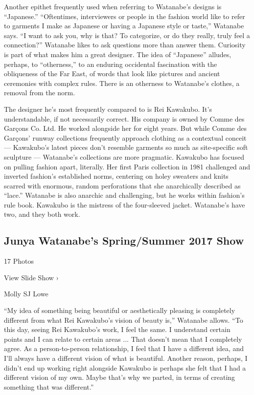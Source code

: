 Another epithet frequently used when referring to Watanabe's designs is
``Japanese.'' ``Oftentimes, interviewers or people in the fashion world
like to refer to garments I make as Japanese or having a Japanese style
or taste,'' Watanabe says. ``I want to ask you, why is that? To
categorize, or do they really, truly feel a connection?'' Watanabe likes
to ask questions more than answer them. Curiosity is part of what makes
him a great designer. The idea of ``Japanese'' alludes, perhaps, to
``otherness,'' to an enduring occidental fascination with the
obliqueness of the Far East, of words that look like pictures and
ancient ceremonies with complex rules. There is an otherness to
Watanabe's clothes, a removal from the norm.

The designer he's most frequently compared to is Rei Kawakubo. It's
understandable, if not necessarily correct. His company is owned by
Comme des Garçons Co. Ltd. He worked alongside her for eight years. But
while Comme des Garçons' runway collections frequently approach clothing
as a contextual conceit --- Kawakubo's latest pieces don't resemble
garments so much as site-specific soft sculpture --- Watanabe's
collections are more pragmatic. Kawakubo has focused on pulling fashion
apart, literally. Her first Paris collection in 1981 challenged and
inverted fashion's established norms, centering on holey sweaters and
knits scarred with enormous, random perforations that she anarchically
described as ``lace.'' Watanabe is also anarchic and challenging, but he
works within fashion's rule book. Kawakubo is the mistress of the
four-sleeved jacket. Watanabe's have two, and they both work.

\href{https://www.nytimes3xbfgragh.onion/slideshow/2016/10/17/t-magazine/fashion/junya-watanabes-spring-summer-2017-show.html}{}

\hypertarget{junya-watanabes-springsummer-2017-show}{%
\subsection{Junya Watanabe's Spring/Summer 2017
Show}\label{junya-watanabes-springsummer-2017-show}}

17 Photos

View Slide Show ›

Molly SJ Lowe

``My idea of something being beautiful or aesthetically pleasing is
completely different from what Rei Kawakubo's vision of beauty is,''
Watanabe allows. ``To this day, seeing Rei Kawakubo's work, I feel the
same. I understand certain points and I can relate to certain areas ...
That doesn't mean that I completely agree. As a person-to-person
relationship, I feel that I have a different idea, and I'll always have
a different vision of what is beautiful. Another reason, perhaps, I
didn't end up working right alongside Kawakubo is perhaps she felt that
I had a different vision of my own. Maybe that's why we parted, in terms
of creating something that was different.''

